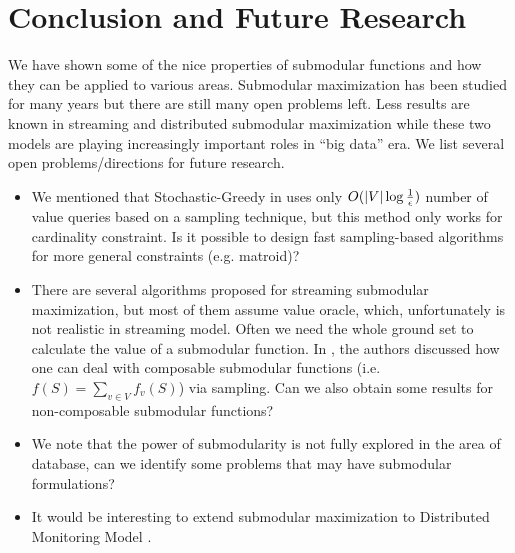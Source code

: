 \section{Conclusion and Future Research}
\label{sec:conclusion}
We have shown some of the nice properties of submodular functions and how they can be applied to various areas. Submodular maximization has been studied for many years but there are still many open problems left. Less results are known in streaming and distributed submodular maximization while these two models are playing increasingly important roles in ``big data'' era. We list several open problems/directions for future research.

\begin{itemize}
\item We mentioned that {\sc Stochastic-Greedy} in \cite{MBK+15} uses only $O(|V|\log\frac{1}{\epsilon})$ number of value queries based on a sampling technique, but this method only works for cardinality constraint. Is it possible to design fast sampling-based algorithms for more general constraints (e.g. matroid)?
\item There are several algorithms proposed for streaming submodular maximization, but most of them assume value oracle, which, unfortunately is not realistic in streaming model. Often we need the whole ground set to calculate the value of a submodular function. In \cite{BMK+14}, the authors discussed how one can deal with composable submodular functions (i.e. $f(S) = \sum_{v\in V}f_v(S)$) via sampling. Can we also obtain some results for non-composable submodular functions?
\item We note that the power of submodularity is not fully explored in the area of database, can we identify some problems that may have submodular formulations? 
\item It would be interesting to extend submodular maximization to Distributed Monitoring Model \cite{CMY11}.
\end{itemize}
